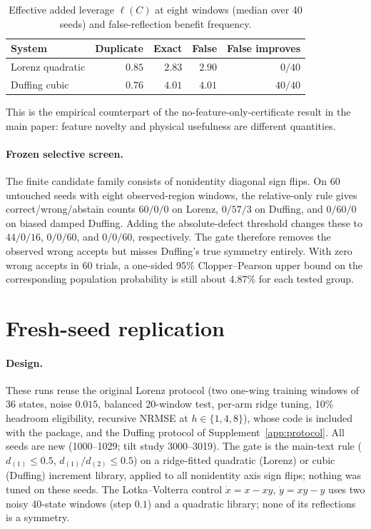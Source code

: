 \begin{table}[h]
\centering\small
\caption{Effective added leverage $\ell(C)$ at eight windows (median over 40 seeds) and false-reflection benefit frequency.}
\begin{tabular}{lrrrr}
\toprule
System & Duplicate & Exact & False & False improves\\
\midrule
Lorenz quadratic & $0.85$ & $2.83$ & $2.90$ & $0/40$\\
Duffing cubic & $0.76$ & $4.01$ & $4.01$ & $40/40$\\
\bottomrule
\end{tabular}
\end{table}
This is the empirical counterpart of the no-feature-only-certificate result in the main paper: feature novelty and physical usefulness are different quantities.

\paragraph{Frozen selective screen.} The finite candidate family consists of nonidentity diagonal sign flips. On 60 untouched seeds with eight observed-region windows, the relative-only rule gives correct/wrong/abstain counts $60/0/0$ on Lorenz, $0/57/3$ on Duffing, and $0/60/0$ on biased damped Duffing. Adding the absolute-defect threshold changes these to $44/0/16$, $0/0/60$, and $0/0/60$, respectively. The gate therefore removes the observed wrong accepts but misses Duffing's true symmetry entirely. With zero wrong accepts in 60 trials, a one-sided 95\% Clopper--Pearson upper bound on the corresponding population probability is still about 4.87\% for each tested group.

\section{Fresh-seed replication}\label{app:reruns}
\paragraph{Design.} These runs reuse the original Lorenz protocol (two one-wing training windows of 36 states, noise $0.015$, balanced 20-window test, per-arm ridge tuning, 10\% headroom eligibility, recursive NRMSE at $h\in\{1,4,8\}$), whose code is included with the package, and the Duffing protocol of Supplement~\ref{app:protocol}. All seeds are new (1000--1029; tilt study 3000--3019). The gate is the main-text rule ($d_{(1)}\le0.5$, $d_{(1)}/d_{(2)}\le0.5$) on a ridge-fitted quadratic (Lorenz) or cubic (Duffing) increment library, applied to all nonidentity axis sign flips; nothing was tuned on these seeds. The Lotka--Volterra control $\dot x=x-xy$, $\dot y=xy-y$ uses two noisy 40-state windows (step $0.1$) and a quadratic library; none of its reflections is a symmetry.

